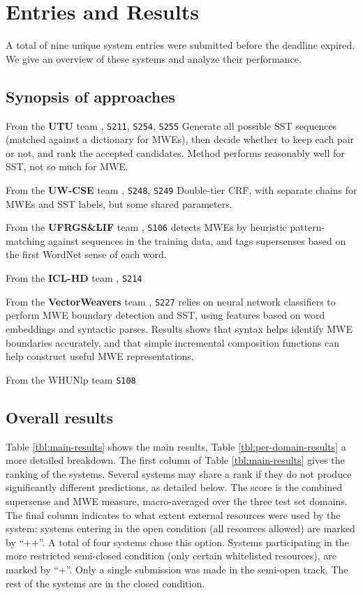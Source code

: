 \documentclass[11pt,letterpaper]{article}
\newcommand{\sys}[1]{\mbox{\texttt{#1}}}   %
\begin{document}
\section{Entries and Results}\label{sec:results}

A total of nine unique system entries were submitted before the deadline expired. 
We give an overview of these systems and analyze their performance.

\subsection{Synopsis of approaches}

From the \textbf{UTU} team \citep{dimsum-16-utu},
\sys{S211}, \sys{S254}, \sys{S255}
Generate all possible SST sequences (matched against a dictionary for MWEs), then decide whether to keep each pair or not, and rank the accepted candidates. Method performs reasonably well for SST, not so much for MWE.

From the \textbf{UW-CSE} team \citep{dimsum-16-uw}, 
\sys{S248}, \sys{S249}
Double-tier CRF, with separate chains for MWEs and SST labels, but some shared parameters.

From the \textbf{UFRGS\&LIF} team \citep{dimsum-16-ufrgs},
\sys{S106} detects MWEs by heuristic pattern-matching against sequences in the training data, 
and tags supersenses based on the first WordNet sense of each word.

From the \textbf{ICL-HD} team \citep{dimsum-16-icl},
\sys{S214}


From the \textbf{VectorWeavers} team \citep{dimsum-16-vector},
\sys{S227} relies on neural network classifiers to perform MWE boundary detection and SST, 
using features based on word embeddings and syntactic parses. 
Results shows that syntax helps identify MWE boundaries accurately, and that 
simple incremental composition functions can help construct useful MWE representations.

From the WHUNlp team
\sys{S108}


\subsection{Overall results}
Table \ref{tbl:main-results} shows the main results, Table \ref{tbl:per-domain-results} a more detailed breakdown. The first column of Table \ref{tbl:main-results} gives the ranking of the systems. Several systems may share a rank if they do not produce significantly different predictions, as detailed below. The score is the combined supersense and MWE measure, macro-averaged over the three test set domains. The final column indicates to what extent external resources were used by the system: systems entering in the open condition (all resources allowed) are marked by ``++''. A total of four systems chose this option. Systems participating in the more restricted semi-closed condition (only certain whitelisted resources), are marked by ``+''. Only a single submission was made in the semi-open track. The rest of the systems are in the closed condition. 
\end{document}
